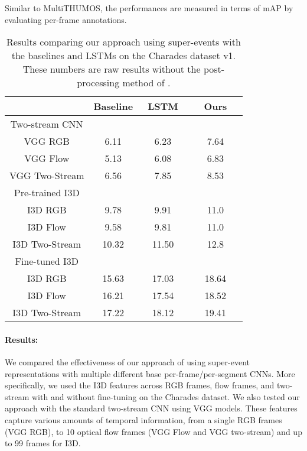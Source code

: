 \documentclass[10pt,twocolumn,letterpaper]{article}
\begin{document}
Similar to MultiTHUMOS, the performances are measured in terms of mAP by evaluating per-frame annotations.



\begin{table}
\caption{Results comparing our approach using super-events with the baselines and LSTMs on the Charades dataset v1. These numbers are raw results without the post-processing method of \cite{sigurdsson2016asynchronous}.}
\label{res:charades-exps}
\centering
\setlength\extrarowheight{0pt}
\begin{tabular}{c|c|c|c}
\hline
 & Baseline & ~LSTM~ & ~~Ours~~ \\
\hline 
\multicolumn{1}{c}{Two-stream CNN}\\
\hline
VGG RGB                 & 6.11 & 6.23 & 7.64 \\
VGG Flow                & 5.13 & 6.08 & 6.83 \\
VGG Two-Stream          & 6.56 & 7.85 & 8.53 \\
\hline 
\multicolumn{1}{c}{Pre-trained I3D}\\
\hline
I3D RGB   & 9.78 & 9.91 & 11.0 \\
I3D Flow  & 9.58  & 9.81 & 11.0 \\
I3D Two-Stream          & 10.32 & 11.50 & 12.8\\
\hline
\multicolumn{1}{c}{Fine-tuned I3D}\\
\hline
I3D RGB      & 15.63 & 17.03 & 18.64 \\
I3D Flow     & 16.21 & 17.54 & 18.52 \\
I3D Two-Stream          & 17.22 & 18.12 & 19.41 \\
\hline
\end{tabular}
\end{table}

\vspace{-3pt}
\paragraph{Results:}

We compared the effectiveness of our approach of using super-event representations with multiple different base per-frame/per-segment CNNs. More specifically, we used the I3D features across RGB frames, flow frames, and two-stream with and without fine-tuning on the Charades dataset. We also tested our approach with the standard two-stream CNN using VGG models. These features capture various amounts of temporal information, from a single RGB frames (VGG RGB), to 10 optical flow frames (VGG Flow and VGG two-stream) and up to 99 frames for I3D.
\end{document}
